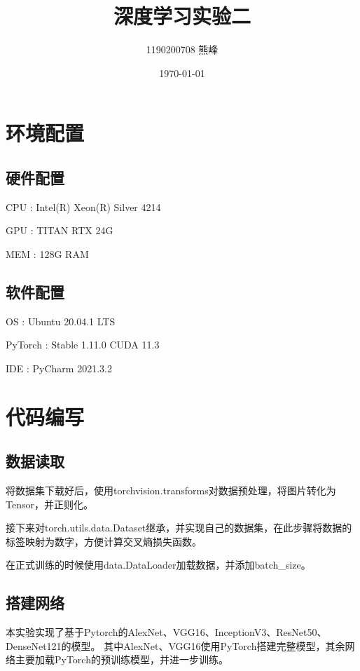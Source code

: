 \documentclass[UTF8]{ctexart}
\title{深度学习实验二}
\author{1190200708 熊峰}
\date{\today}
\begin{document}
 
\maketitle 

\newpage
\tableofcontents
\newpage

\section{环境配置}
\subsection{硬件配置}
CPU : Intel(R) Xeon(R) Silver 4214 \par
GPU : TITAN RTX 24G \par
MEM : 128G RAM  \par
\subsection{软件配置}
OS : Ubuntu 20.04.1 LTS \par
PyTorch : Stable 1.11.0  CUDA 11.3 \par
IDE : PyCharm 2021.3.2 \par


\section{代码编写}

\subsection{数据读取}
将数据集下载好后，使用torchvision.transforms对数据预处理，将图片转化为Tensor，并正则化。\par
接下来对torch.utils.data.Dataset继承，并实现自己的数据集，在此步骤将数据的标签映射为数字，方便计算交叉熵损失函数。\par
在正式训练的时候使用data.DataLoader加载数据，并添加batch\_size。\par 
\subsection{搭建网络}
本实验实现了基于Pytorch的AlexNet、VGG16、InceptionV3、ResNet50、DenseNet121的模型。
其中AlexNet、VGG16使用PyTorch搭建完整模型，其余网络主要加载PyTorch的预训练模型，并进一步训练。\par
\end{document}
